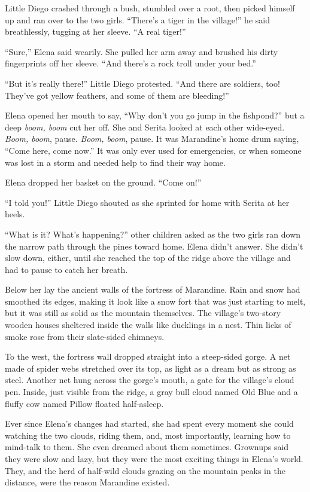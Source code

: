 \documentclass[10pt]{book}
\begin{document}
Little Diego crashed through a bush, stumbled over a root, then picked himself up and ran over to the two girls. ``There's a tiger in the village!'' he said breathlessly, tugging at her sleeve. ``A real tiger!''

``Sure,'' Elena said wearily. She pulled her arm away and brushed his dirty fingerprints off her sleeve. ``And there's a rock troll under your bed.''

``But it's really there!'' Little Diego protested. ``And there are soldiers, too!  They've got yellow feathers, and some of them are bleeding!''

Elena opened her mouth to say, ``Why don't you go jump in the fishpond?'' but a deep \emph{boom, boom} cut her off. She and Serita looked at each other wide-eyed. \emph{Boom, boom}, pause. \emph{Boom, boom}, pause. It was Marandine's home drum saying, ``Come here, come now.'' It was only ever used for emergencies, or when someone was lost in a storm and needed help to find their way home.

Elena dropped her basket on the ground. ``Come on!''

``I told you!'' Little Diego shouted as she sprinted for home with Serita at her heels.

``What is it? What's happening?'' other children asked as the two girls ran down the narrow path through the pines toward home. Elena didn't answer. She didn't slow down, either, until she reached the top of the ridge above the village and had to pause to catch her breath.

Below her lay the ancient walls of the fortress of Marandine. Rain and snow had smoothed its edges, making it look like a snow fort that was just starting to melt, but it was still as solid as the mountain themselves. The village's two-story wooden houses sheltered inside the walls like ducklings in a nest. Thin licks of smoke rose from their slate-sided chimneys.

To the west, the fortress wall dropped straight into a steep-sided gorge. A net made of spider webs stretched over its top, as light as a dream but as strong as steel. Another net hung across the gorge's mouth, a gate for the village's cloud pen. Inside, just visible from the ridge, a gray bull cloud named Old Blue and a fluffy cow named Pillow floated half-asleep.

Ever since Elena's changes had started, she had spent every moment she could watching the two clouds, riding them, and, most importantly, learning how to mind-talk to them. She even dreamed about them sometimes. Grownups said they were slow and lazy, but they were the most exciting things in Elena's world. They, and the herd of half-wild clouds grazing on the mountain peaks in the distance, were the reason Marandine existed.
\end{document}
